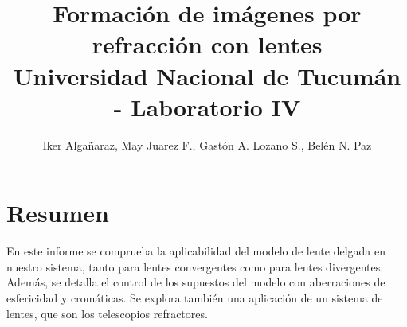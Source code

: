 \documentclass[a4paper,12pt]{article}
\title{Formación de imágenes por refracción con lentes \\ 
\medskip \large Universidad Nacional de Tucumán - Laboratorio IV}
\author{Iker Algañaraz, May Juarez F., Gastón A. Lozano S., Belén N. Paz}
\date{}
\begin{document}
\maketitle

\section*{Resumen}

    En este informe se comprueba la aplicabilidad del modelo de lente delgada en nuestro sistema, tanto para lentes convergentes como para lentes divergentes. Además, se detalla el control de los supuestos del modelo con aberraciones de esfericidad y cromáticas. Se explora también una aplicación de un sistema de lentes, que son los telescopios refractores.

\medskip
\end{document}
